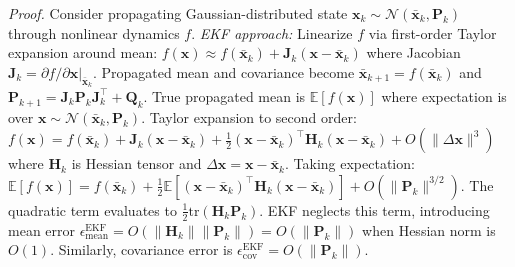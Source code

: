 \documentclass[pdflatex,sn-nature]{sn-jnl}%
\begin{document}
\textit{Proof.} Consider propagating Gaussian-distributed state $\mathbf{x}_k \sim \mathcal{N}(\bar{\mathbf{x}}_k, \mathbf{P}_k)$ through nonlinear dynamics $f$. \textit{EKF approach:} Linearize $f$ via first-order Taylor expansion around mean: $f(\mathbf{x}) \approx f(\bar{\mathbf{x}}_k) + \mathbf{J}_k (\mathbf{x} - \bar{\mathbf{x}}_k)$ where Jacobian $\mathbf{J}_k = \partial f/\partial \mathbf{x}|_{\bar{\mathbf{x}}_k}$. Propagated mean and covariance become $\bar{\mathbf{x}}_{k+1} = f(\bar{\mathbf{x}}_k)$ and $\mathbf{P}_{k+1} = \mathbf{J}_k \mathbf{P}_k \mathbf{J}_k^\top + \mathbf{Q}_k$. True propagated mean is $\mathbb{E}[f(\mathbf{x})]$ where expectation is over $\mathbf{x} \sim \mathcal{N}(\bar{\mathbf{x}}_k, \mathbf{P}_k)$. Taylor expansion to second order: $f(\mathbf{x}) = f(\bar{\mathbf{x}}_k) + \mathbf{J}_k (\mathbf{x} - \bar{\mathbf{x}}_k) + \frac{1}{2} (\mathbf{x} - \bar{\mathbf{x}}_k)^\top \mathbf{H}_k (\mathbf{x} - \bar{\mathbf{x}}_k) + O(\|\Delta \mathbf{x}\|^3)$ where $\mathbf{H}_k$ is Hessian tensor and $\Delta \mathbf{x} = \mathbf{x} - \bar{\mathbf{x}}_k$. Taking expectation: $\mathbb{E}[f(\mathbf{x})] = f(\bar{\mathbf{x}}_k) + \frac{1}{2} \mathbb{E}[(\mathbf{x} - \bar{\mathbf{x}}_k)^\top \mathbf{H}_k (\mathbf{x} - \bar{\mathbf{x}}_k)] + O(\|\mathbf{P}_k\|^{3/2})$. The quadratic term evaluates to $\frac{1}{2} \text{tr}(\mathbf{H}_k \mathbf{P}_k)$. EKF neglects this term, introducing mean error $\epsilon_{\text{mean}}^{\text{EKF}} = O(\|\mathbf{H}_k\| \|\mathbf{P}_k\|) = O(\|\mathbf{P}_k\|)$ when Hessian norm is $O(1)$. Similarly, covariance error is $\epsilon_{\text{cov}}^{\text{EKF}} = O(\|\mathbf{P}_k\|)$.
\end{document}
